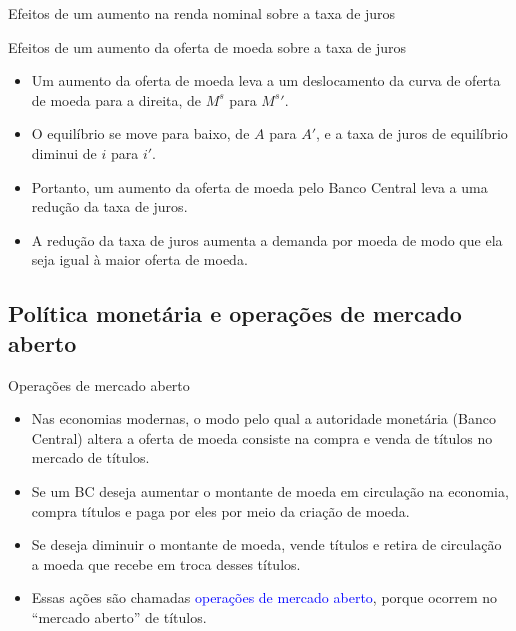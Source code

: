 \documentclass[10pt]{beamer}
\begin{document}
\begin{frame}{Efeitos de um aumento na renda nominal sobre a taxa de juros}
\begin{frame}{Efeitos de um aumento da oferta de moeda sobre a taxa de juros}
\begin{itemize}
    \item Um aumento da oferta de moeda leva a um deslocamento da curva de oferta de moeda para a direita, de $M^s$ para $M^s'$.
    \bigskip
    \item O equilíbrio se move para baixo, de $A$ para $A'$, e a taxa de juros de equilíbrio diminui de $i$ para $i'$.
    \bigskip
    \item Portanto, um aumento da oferta de moeda pelo Banco Central leva a uma redução da taxa de juros.
    \bigskip
    \item A redução da taxa de juros aumenta a demanda por moeda de modo que ela seja igual à maior oferta de moeda.
\end{itemize}
\end{frame}

\subsection{Política monetária e operações de mercado aberto}
\begin{frame}{Operações de mercado aberto}
\begin{itemize}
    \item Nas economias modernas, o modo pelo qual a autoridade monetária (Banco Central) altera a oferta de moeda consiste na compra e venda de títulos no mercado de títulos.
    \bigskip
    \item Se um BC deseja aumentar o montante de moeda em circulação na economia, compra títulos e paga por eles por meio da criação de moeda.
    \bigskip
    \item Se deseja diminuir o montante de moeda, vende títulos e retira de circulação a moeda que recebe em troca desses títulos.
    \bigskip
    \item Essas ações são chamadas \textcolor{blue}{operações de mercado aberto}, porque ocorrem no ``mercado aberto'' de títulos.
\end{itemize}    
\end{frame}


\end{frame}
\end{document}
